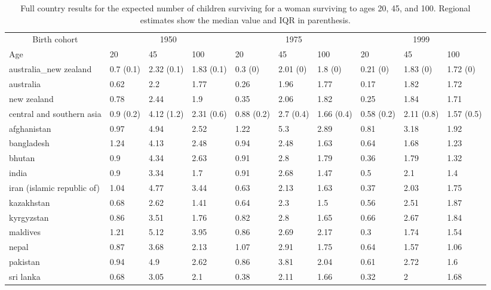 \begin{table}[!h]

\caption{\label{tab:S6}Full country results for the expected number of children surviving for a woman surviving to ages 20, 45, and 100. Regional estimates show the median value and IQR in parenthesis.}
\centering
\begin{tabular}[t]{llllllllll}
\toprule
\multicolumn{1}{c}{Birth cohort} & \multicolumn{3}{c}{1950} & \multicolumn{3}{c}{1975} & \multicolumn{3}{c}{1999} \\
\cmidrule(l{3pt}r{3pt}){1-1} \cmidrule(l{3pt}r{3pt}){2-4} \cmidrule(l{3pt}r{3pt}){5-7} \cmidrule(l{3pt}r{3pt}){8-10}
Age & 20 & 45 & 100 & 20 & 45 & 100 & 20 & 45 & 100\\
\midrule
australia\_new zealand & 0.7 (0.1) & 2.32 (0.1) & 1.83 (0.1) & 0.3 (0) & 2.01 (0) & 1.8 (0) & 0.21 (0) & 1.83 (0) & 1.72 (0)\\
australia & 0.62 & 2.2 & 1.77 & 0.26 & 1.96 & 1.77 & 0.17 & 1.82 & 1.72\\
new zealand & 0.78 & 2.44 & 1.9 & 0.35 & 2.06 & 1.82 & 0.25 & 1.84 & 1.71\\
central and southern asia & 0.9 (0.2) & 4.12 (1.2) & 2.31 (0.6) & 0.88 (0.2) & 2.7 (0.4) & 1.66 (0.4) & 0.58 (0.2) & 2.11 (0.8) & 1.57 (0.5)\\
afghanistan & 0.97 & 4.94 & 2.52 & 1.22 & 5.3 & 2.89 & 0.81 & 3.18 & 1.92\\
\addlinespace
bangladesh & 1.24 & 4.13 & 2.48 & 0.94 & 2.48 & 1.63 & 0.64 & 1.68 & 1.23\\
bhutan & 0.9 & 4.34 & 2.63 & 0.91 & 2.8 & 1.79 & 0.36 & 1.79 & 1.32\\
india & 0.9 & 3.34 & 1.7 & 0.91 & 2.68 & 1.47 & 0.5 & 2.1 & 1.4\\
iran (islamic republic of) & 1.04 & 4.77 & 3.44 & 0.63 & 2.13 & 1.63 & 0.37 & 2.03 & 1.75\\
kazakhstan & 0.68 & 2.62 & 1.41 & 0.64 & 2.3 & 1.5 & 0.56 & 2.51 & 1.87\\
\addlinespace
kyrgyzstan & 0.86 & 3.51 & 1.76 & 0.82 & 2.8 & 1.65 & 0.66 & 2.67 & 1.84\\
maldives & 1.21 & 5.12 & 3.95 & 0.86 & 2.69 & 2.17 & 0.3 & 1.74 & 1.54\\
nepal & 0.87 & 3.68 & 2.13 & 1.07 & 2.91 & 1.75 & 0.64 & 1.57 & 1.06\\
pakistan & 0.94 & 4.9 & 2.62 & 0.86 & 3.81 & 2.04 & 0.61 & 2.72 & 1.6\\
sri lanka & 0.68 & 3.05 & 2.1 & 0.38 & 2.11 & 1.66 & 0.32 & 2 & 1.68\\

\end{tabular}
\end{table}

